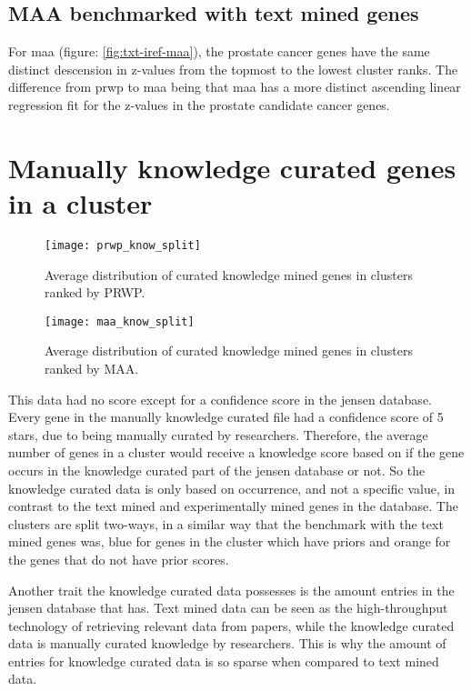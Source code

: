 \subsection{MAA benchmarked with text mined genes}
For \gls{maa} (figure: \ref{fig:txt-iref-maa}), the prostate cancer genes have the same
distinct descension in z-values from the topmost to the lowest cluster ranks.
The difference from \gls{prwp} to \gls{maa} being that \gls{maa} has a more
distinct ascending linear regression fit for the z-values in the prostate
candidate cancer genes.

\section{Manually knowledge curated genes in a cluster}
\begin{sidewaysfigure}
    \texttt{[image: prwp\_know\_split]}
    \caption{Average distribution of curated knowledge mined genes in clusters
    ranked by PRWP.}
    \label{fig:know-iref-prwp}
\end{sidewaysfigure}

\begin{sidewaysfigure}
    \texttt{[image: maa\_know\_split]}
    \caption{Average distribution of curated knowledge mined genes in clusters
    ranked by MAA.}
    \label{fig:know-iref-maa}
\end{sidewaysfigure}

This data had no score except for a confidence score in the \gls{jensen}
database. Every gene in the manually knowledge curated file had a confidence
score of 5 stars, due to being manually curated by researchers\cite{jensen}.
Therefore, the average number of genes in a cluster would receive a knowledge
score based on if the gene occurs in the knowledge curated part of the
\gls{jensen} database or not. So the knowledge curated data is only based on
occurrence, and not a specific value, in contrast to the text mined and
experimentally mined genes in the database. The clusters are split two-ways, in
a similar way that the benchmark with the text mined genes was, blue for genes
in the cluster which have priors and orange for the genes that do not have prior
scores.

Another trait the knowledge curated data possesses is the amount entries in the
\gls{jensen} database that has. Text mined data can be seen as the
high-throughput technology of retrieving relevant data from papers, while the
knowledge curated data is manually curated knowledge by researchers. This is why
the amount of entries for knowledge curated data is so sparse when compared to
text mined data.

